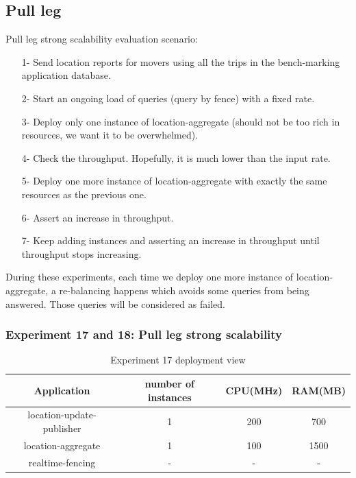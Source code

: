 \documentclass[a4]{report}
\begin{document}
    \subsection{Pull leg}
    Pull leg strong scalability evaluation scenario:
    \begin{itemize}
        \item[1-] Send location reports for movers using all the trips in the bench-marking application database.
        \item[2-] Start an ongoing load of queries (query by fence) with a fixed rate.
        \item[3-] Deploy only one instance of location-aggregate (should not be too rich in resources, we want it to be overwhelmed).
        \item[4-] Check the throughput.
        Hopefully, it is much lower than the input rate.
        \item[5-] Deploy one more instance of location-aggregate with exactly the same resources as the previous one.
        \item[6-] Assert an increase in throughput.
        \item[7-] Keep adding instances and asserting an increase in throughput until throughput stops increasing.
    \end{itemize}

    During these experiments, each time we deploy one more instance of location-aggregate, a re-balancing happens which
    avoids some queries from being answered.
    Those queries will be considered as failed.

    \subsubsection{Experiment 17 and 18: Pull leg strong scalability}
    \begin{table}[h!]
        \centering
        \begin{tabular}{|c|c|c|c|}
            \hline
            Application               & number of instances & CPU(MHz) & RAM(MB) \\
            \hline
            location-update-publisher & 1                   & 200      & 700     \\
            location-aggregate        & 1                   & 100      & 1500    \\
            realtime-fencing          & -                   & -        & -       \\
            \hline
        \end{tabular}
        \caption{Experiment 17 deployment view}
        \label{table:ex17-dv}
    \end{table}
\end{document}
